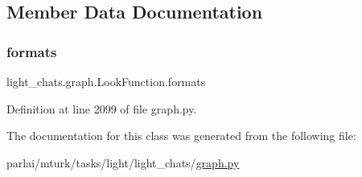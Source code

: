 \subsection{Member Data Documentation}
\mbox{\label{classlight__chats_1_1graph_1_1LookFunction_a98ca1312bcaf009a34ee3e1b1b43a3d6}} 
\subsubsection{\texorpdfstring{formats}{formats}}
{\footnotesize\ttfamily light\+\_\+chats.\+graph.\+Look\+Function.\+formats}



Definition at line 2099 of file graph.\+py.



The documentation for this class was generated from the following file\+:\begin{DoxyCompactItemize}
\item 
parlai/mturk/tasks/light/light\+\_\+chats/\hyperlink{parlai_2mturk_2tasks_2light_2light__chats_2graph_8py}{graph.\+py}\end{DoxyCompactItemize}
